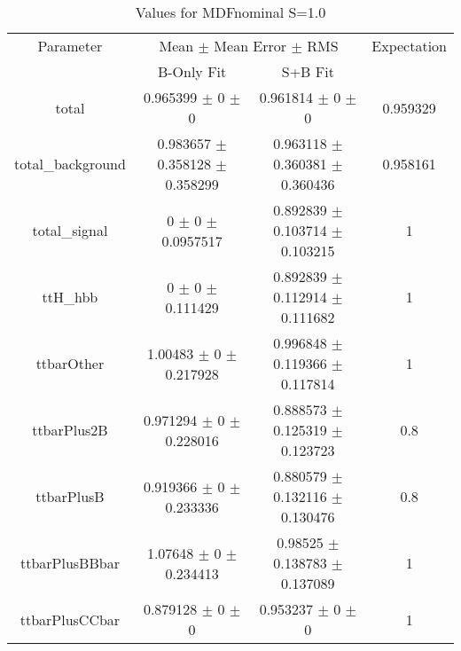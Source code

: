 \begin{table}
\centering
\caption{Values for MDFnominal S=1.0}
\begin{tabular}{cccc}
\toprule
Parameter & \multicolumn{2}{c}{Mean $\pm$ Mean Error $\pm$ RMS} & Expectation\\
 & B-Only Fit & S+B Fit & \\
\midrule
total & \num{0.965399} $\pm$ \num{0} $\pm$ \num{0} & \num{0.961814} $\pm$ \num{0} $\pm$ \num{0} & \num{0.959329}\\
total\_background & \num{0.983657} $\pm$ \num{0.358128} $\pm$ \num{0.358299} & \num{0.963118} $\pm$ \num{0.360381} $\pm$ \num{0.360436} & \num{0.958161}\\
total\_signal & \num{0} $\pm$ \num{0} $\pm$ \num{0.0957517} & \num{0.892839} $\pm$ \num{0.103714} $\pm$ \num{0.103215} & \num{1}\\
ttH\_hbb & \num{0} $\pm$ \num{0} $\pm$ \num{0.111429} & \num{0.892839} $\pm$ \num{0.112914} $\pm$ \num{0.111682} & \num{1}\\
ttbarOther & \num{1.00483} $\pm$ \num{0} $\pm$ \num{0.217928} & \num{0.996848} $\pm$ \num{0.119366} $\pm$ \num{0.117814} & \num{1}\\
ttbarPlus2B & \num{0.971294} $\pm$ \num{0} $\pm$ \num{0.228016} & \num{0.888573} $\pm$ \num{0.125319} $\pm$ \num{0.123723} & \num{0.8}\\
ttbarPlusB & \num{0.919366} $\pm$ \num{0} $\pm$ \num{0.233336} & \num{0.880579} $\pm$ \num{0.132116} $\pm$ \num{0.130476} & \num{0.8}\\
ttbarPlusBBbar & \num{1.07648} $\pm$ \num{0} $\pm$ \num{0.234413} & \num{0.98525} $\pm$ \num{0.138783} $\pm$ \num{0.137089} & \num{1}\\
ttbarPlusCCbar & \num{0.879128} $\pm$ \num{0} $\pm$ \num{0} & \num{0.953237} $\pm$ \num{0} $\pm$ \num{0} & \num{1}\\
\bottomrule
\end{tabular}
\end{table}